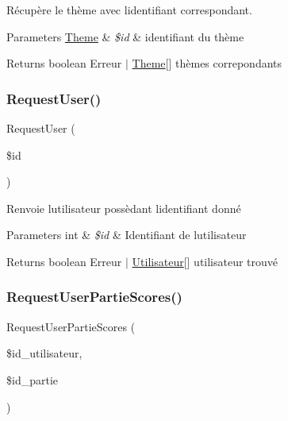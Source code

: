 Récupère le thème avec l\textquotesingle{}identifiant correspondant. 


\begin{DoxyParams}[1]{Parameters}
\mbox{\hyperlink{class_theme}{Theme}} & {\em \$id} & identifiant du thème\\
\hline
\end{DoxyParams}
\begin{DoxyReturn}{Returns}
boolean Erreur $\vert$ \mbox{\hyperlink{class_theme}{Theme}}\mbox{[}\mbox{]} thèmes correpondants 
\end{DoxyReturn}
\mbox{\label{class_interface_b_d_d_a3069460bb26daac4b0777cb763ab198a}} 
\subsubsection{\texorpdfstring{Request\+User()}{RequestUser()}}
{\footnotesize\ttfamily Request\+User (\begin{DoxyParamCaption}\item[{}]{\$id }\end{DoxyParamCaption})}



Renvoie l\textquotesingle{}utilisateur possèdant l\textquotesingle{}identifiant donné 


\begin{DoxyParams}[1]{Parameters}
int & {\em \$id} & Identifiant de l\textquotesingle{}utilisateur\\
\hline
\end{DoxyParams}
\begin{DoxyReturn}{Returns}
boolean Erreur $\vert$ \mbox{\hyperlink{class_utilisateur}{Utilisateur}}\mbox{[}\mbox{]} utilisateur trouvé 
\end{DoxyReturn}
\mbox{\label{class_interface_b_d_d_a71f154f1bff6e6659dddefcde250f993}} 
\subsubsection{\texorpdfstring{Request\+User\+Partie\+Scores()}{RequestUserPartieScores()}}
{\footnotesize\ttfamily Request\+User\+Partie\+Scores (\begin{DoxyParamCaption}\item[{}]{\$id\+\_\+utilisateur,  }\item[{}]{\$id\+\_\+partie }\end{DoxyParamCaption})}



